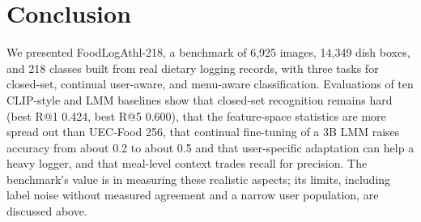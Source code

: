 \documentclass[sigconf, nonacm]{acmart}
\begin{document}
\section{Conclusion}
We presented FoodLogAthl-218, a benchmark of 6,925 images, 14,349 dish boxes, and 218 classes built from real dietary logging records, with three tasks for closed-set, continual user-aware, and menu-aware classification. Evaluations of ten CLIP-style and LMM baselines show that closed-set recognition remains hard (best R@1 0.424, best R@5 0.600), that the feature-space statistics are more spread out than UEC-Food 256, that continual fine-tuning of a 3B LMM raises accuracy from about 0.2 to about 0.5 and that user-specific adaptation can help a heavy logger, and that meal-level context trades recall for precision. The benchmark's value is in measuring these realistic aspects; its limits, including label noise without measured agreement and a narrow user population, are discussed above.



\end{document}
